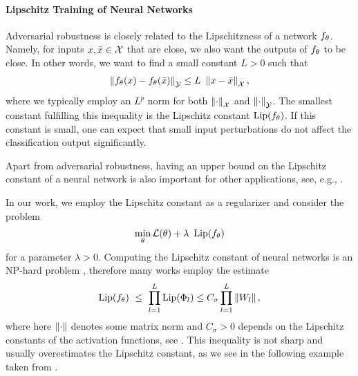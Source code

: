 \paragraph{Lipschitz Training of Neural Networks}
%
Adversarial robustness is closely related to the Lipschitzness of a network $f_\theta$. Namely, for inputs $x,\bar{x}\in\mathcal{X}$ that are close, we also want the outputs of $f_\theta$ to be close. In other words, we want to find a small constant $L>0$ such that
%
\begin{align*}
\norm{\net_\param(\inp) - \net_\param(\inpp)}_\Oup \leq L\ \norm{\inp-\inpp}_\Inp,
\end{align*}
%
where we typically employ an $L^p$ norm for both $\left\|\cdot\right\|_{\mathcal{X}}$ and $\left\|\cdot\right\|_{\mathcal{\mathcal{Y}}}$.
%
The smallest constant fulfilling this inequality is the Lipschitz constant $\operatorname{Lip}(f_\theta)$. If this constant is small, one can expect that small input perturbations do not affect the classification output significantly.
%
\begin{remark}{}{}
Apart from adversarial robustness, having an upper bound on the Lipschitz constant of a neural network is also important for other applications, see, e.g., \cite{arndt2023invertible,hasannasab2020parseval, arjovsky2017wasserstein}.
\end{remark}
%
%
\noindent%
In our work, we employ the Lipschitz constant as a regularizer and consider the problem
%
\begin{align}\label{eq:LipReg}
\min_\theta \mathcal{L}(\theta) +\lambda\ \operatorname{Lip}(f_\theta)
\end{align}
%
for a parameter $\lambda>0$. Computing the Lipschitz constant of neural networks is an NP-hard problem \cite{scaman2018lipschitz}, therefore many works employ the estimate
%
\begin{align}\label{ineq:lip_weights}
\operatorname{Lip}(f_\theta) \ \leq \ \prod_{l=1}^L  \operatorname{Lip}(\Phi_l) \leq 
C_\sigma \prod_{l=1}^L \left\|W_l\right\|,
\end{align}
%
where here $\left\|\cdot\right\|$ denotes some matrix norm and $C_\sigma>0$ depends on the Lipschitz constants of the activation functions, see \cite{Anil2019,gouk2020regularisation, Krishnan2020, Roth2020}.
%
This inequality is not sharp and usually overestimates the Lipschitz constant, as we see in the following example taken from \cite{bungert2021clip}.
%
